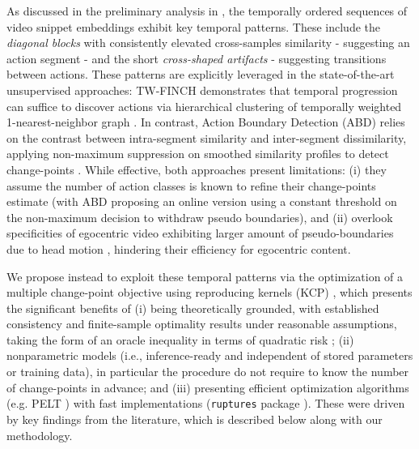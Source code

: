     As discussed in the preliminary analysis in , the temporally ordered sequences of video snippet embeddings exhibit key temporal patterns. These include the \textit{diagonal blocks} with consistently elevated cross-samples similarity - suggesting an action segment - and the short \textit{cross-shaped artifacts} - suggesting transitions between actions. These patterns are explicitly leveraged in the state-of-the-art unsupervised approaches: TW-FINCH demonstrates that temporal progression can suffice to discover actions via hierarchical clustering of temporally weighted 1-nearest-neighbor graph \cite{twfinch}.  In contrast, Action Boundary Detection (ABD) relies on the contrast between intra-segment similarity and inter-segment dissimilarity, applying non-maximum suppression on smoothed similarity profiles to detect change-points \cite{9879786}. While effective, both approaches present limitations: (i) they assume the number of action classes is known to refine their change-points estimate (with ABD proposing an online version using a constant threshold on the non-maximum decision to withdraw pseudo boundaries), and (ii) overlook specificities of egocentric video exhibiting larger amount of pseudo-boundaries due to head motion \cite{sam_icassp}, hindering their efficiency for egocentric content.

    We propose instead to exploit these temporal patterns via the optimization of a multiple change-point objective using reproducing kernels (KCP) \cite{cpt}, which presents the significant benefits of (i) being theoretically grounded, with established consistency \cite{garreau2018consistent} and finite-sample optimality results under reasonable assumptions, taking the form of an oracle inequality in terms of quadratic risk \cite{CELISSE2018200, cpt}; (ii) nonparametric models (i.e., inference-ready and independent of stored parameters or training data), in particular the procedure do not require to know the number of change-points in advance; and (iii) presenting efficient optimization algorithms (e.g. PELT \cite{pelt}) with fast implementations (\texttt{ruptures} package \cite{ruptures}). These were driven by key findings from the literature, which is described below along with our methodology.





